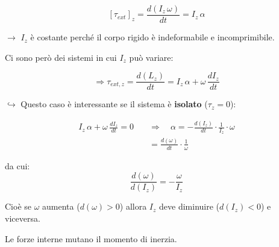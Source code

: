 \begin{equation}
\left[\tau_{ext}\right]_z = \frac{d(I_z\,\omega)}{dt} = \boxed{I_z\,\alpha}
\end{equation}

$\rightarrow$ $I_z$ è costante perché il corpo rigido è indeformabile e incomprimibile.

Ci sono però dei sistemi in cui $I_z$ può variare:


\begin{equation}
\Rightarrow \tau_{ext,z} = \frac{d(L_z)}{dt} = I_z\,\alpha + \omega\,\frac{dI_z}{dt}
\end{equation}

$\hookrightarrow$ Questo caso è interessante se il sistema è \textbf{isolato} ($\tau_z = 0$):

\begin{align*}
I_z\,\alpha + \omega\,\frac{dI_z}{dt} = 0 \quad &\Rightarrow \quad \alpha = -\frac{d(I_z)}{dt}\cdot\frac{1}{I_z}\cdot\omega \\
&= \frac{d(\omega)}{dt}\cdot\frac{1}{\omega}
\end{align*}

da cui:
\begin{equation}
\frac{d(\omega)}{d(I_z)} = -\frac{\omega}{I_z}
\end{equation}

Cioè se $\omega$ aumenta ($d(\omega) > 0$) allora $I_z$ deve diminuire ($d(I_z) < 0$) e viceversa.

\begin{osservazione}{}
Le forze interne mutano il momento di inerzia.
\end{osservazione}
